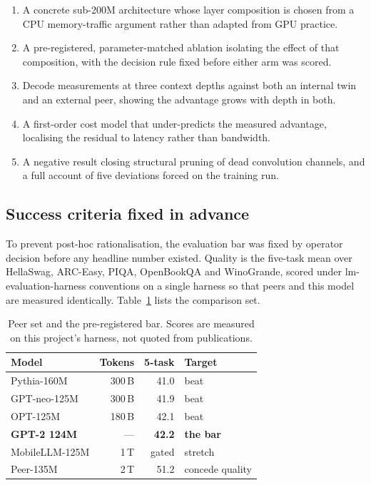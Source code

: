 \documentclass[conference]{IEEEtran}
\begin{document}
\begin{enumerate}
\item A concrete sub-200M architecture whose layer composition is chosen from a
      CPU memory-traffic argument rather than adapted from GPU practice.
\item A pre-registered, parameter-matched ablation isolating the effect of that
      composition, with the decision rule fixed before either arm was scored.
\item Decode measurements at three context depths against both an internal twin
      and an external peer, showing the advantage grows with depth in both.
\item A first-order cost model that under-predicts the measured advantage,
      localising the residual to latency rather than bandwidth.
\item A negative result closing structural pruning of dead convolution channels,
      and a full account of five deviations forced on the training run.
\end{enumerate}

\subsection{Success criteria fixed in advance}

To prevent post-hoc rationalisation, the evaluation bar was fixed by operator
decision before any headline number existed. Quality is the five-task mean over
HellaSwag, ARC-Easy, PIQA, OpenBookQA and WinoGrande, scored under
lm-evaluation-harness conventions on a single harness so that peers and this
model are measured identically. Table~\ref{tab:peers} lists the comparison set.

\begin{table}[t]
\caption{Peer set and the pre-registered bar. Scores are measured on this
project's harness, not quoted from publications.}
\label{tab:peers}
\centering
\begin{tabular}{@{}lrrl@{}}
\toprule
\textbf{Model} & \textbf{Tokens} & \textbf{5-task} & \textbf{Target} \\
\midrule
Pythia-160M      & 300\,B & 41.0 & beat \\
GPT-neo-125M     & 300\,B & 41.9 & beat \\
OPT-125M         & 180\,B & 42.1 & beat \\
\textbf{GPT-2 124M} & --- & \textbf{42.2} & \textbf{the bar} \\
MobileLLM-125M   & 1\,T   & gated & stretch \\
Peer-135M        & 2\,T   & 51.2 & concede quality \\
\bottomrule
\end{tabular}
\end{table}
\end{document}
